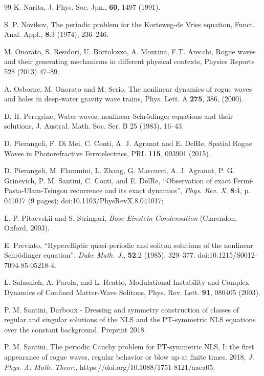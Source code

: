 \documentclass[12pt]{article}
\begin{document}
\begin{thebibliography}{99}
  K. Narita, J. Phys. Soc. Jpn., {\bf 60}, 1497 (1991).

 S. P. Novikov, The periodic problem for the Korteweg-de Vries equation, Funct. Anal. Appl., \textbf{8}:3 (1974), 236--246.

 M. Onorato, S. Residori, U. Bortolozzo, A. Montina, F.T. Arecchi, Rogue waves and their generating mechanisms in different physical contexts, Physics Reports 528 (2013) 47--89. 

 A. Osborne, M. Onorato and M. Serio, The nonlinear dynamics of rogue waves and holes in deep-water gravity wave trains, Phys. Lett. A {\bf 275}, 386, (2000).

 D. H. Peregrine, Water waves, nonlinear Schr\"odinger equations and their solutions, J. Austral. Math. Soc. Ser. B 25 (1983), 16--43.

 D. Pierangeli, F. Di Mei, C. Conti, A. J. Agranat and E. DelRe, Spatial Rogue Waves in Photorefractive Ferroelectrics, PRL {\bf 115}, 093901 (2015).
 
 D. Pierangeli, M. Flammini, L. Zhang, G. Marcucci, A. J. Agranat, P. G. Grinevich, P. M. Santini, C. Conti, and E. DelRe, ``Observation of exact Fermi-Pasta-Ulam-Tsingou recurrence and its exact dynamics'', \textit{Phys. Rev. X}, \textbf{8}:4, p. 041017 (9 pages); doi:10.1103/PhysRevX.8.041017; 

 L. P. Pitaevskii and S. Stringari, {\it Bose-Einstein Condensation} (Clarendon, Oxford, 2003).

 E. Previato, ``Hyperelliptic quasi-periodic and soliton solutions of the nonlinear Schrödinger equation'', \textit{Duke Math. J.}, \textbf{52}:2 (1985), 329--377. doi:10.1215/S0012-7094-85-05218-4.

 L. Salasnich, A. Parola, and L. Reatto, Modulational Instability and Complex Dynamics of Confined Matter-Wave Solitons, Phys. Rev. Lett. {\bf 91}, 080405 (2003).

 P. M. Santini, Darboux - Dressing and symmetry construction of classes of regular and singular solutions of the NLS and the PT-symmetric NLS equations over the constant background. Preprint 2018.

 P. M. Santini, The periodic Cauchy problem for PT-symmetric NLS, I: the first appearance of rogue waves, regular behavior or blow up at finite times. 2018, \textit{J. Phys. A: Math. Theor.}, https://doi.org/10.1088/1751-8121/aaea05. 


\end{thebibliography}
\end{document}
